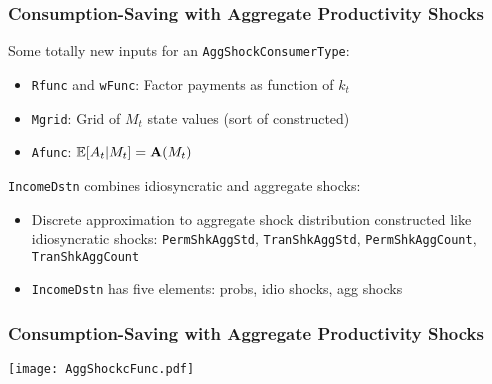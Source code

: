 \documentclass[public]{beamer}\beamerdefaultoverlayspecification{<+->}
\begin{document}
\begin{frame}
  \frametitle{Consumption-Saving with Aggregate Productivity Shocks}
  Some totally new inputs for an \texttt{AggShockConsumerType}:
  \begin{itemize}
  \item \texttt{Rfunc} and \texttt{wFunc}: Factor payments as function of $k_t$

  \item \texttt{Mgrid}: Grid of $M_t$ state values (sort of constructed)

  \item \texttt{Afunc}: $\mathbb{E}[A_t | M_t] = \mathbf{A}(M_t)$
  \end{itemize}

  \texttt{IncomeDstn} combines idiosyncratic and aggregate shocks:
  \begin{itemize}
  \item Discrete approximation to aggregate shock distribution constructed like idiosyncratic shocks: \texttt{PermShkAggStd}, \texttt{TranShkAggStd}, \texttt{PermShkAggCount}, \texttt{TranShkAggCount}

  \item \texttt{IncomeDstn} has five elements: probs, idio shocks, agg shocks
  \end{itemize}
\end{frame}

\begin{frame}
  \frametitle{Consumption-Saving with Aggregate Productivity Shocks}
  \begin{center}
    \texttt{[image: AggShockcFunc.pdf]}
  \end{center}
\end{frame}
\end{document}
